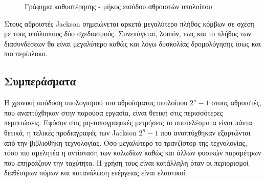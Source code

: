 \begin{figure}[H]
\begin{center}
\end{center}
\caption{Γράφημα καθυστέρησης - μήκος εισόδου αθροιστών υπολοίπου}   
\label{graph:gap_between_interconection_and_gates_delay}
\end{figure}


Στους αθροιστές Jackson σημειώνεται αρκετά μεγαλύτερο πλήθος κόμβων σε σχέση με τους υπόλοιπους δύο σχεδιασμούς. Συνεπάγεται, λοιπόν, πως και το πλήθος των διασυνδέσεων θα είναι μεγαλύτερο καθώς και λόγω δυσκολίας δρομολόγησης ίσως και πιο περίπλοκο.




\subsection{Συμπεράσματα}

Η χρονική απόδοση υπολογισμού του αθροίσματος υπολοίπου $2^n-1$ στους αθροιστές, που αναπτύχθηκαν στην παρούσα εργασία, είναι θετική στις περισσότερες περιπτώσεις. Εφόσον στις μη-τοπογραφικές μετρήσεις το αποτελέσματα είναι πάντα θετικά, η τελικές προδιαγραφές των Jackson $2^n-1$ που αναπτύχθηκαν εξαρτώνται από την βιβλιοθήκη τεχνολογίας. Όσο μεγαλύτερο το τρανζίστορ της τεχνολογίας, τόσο πιο αμελητέα η αντίσταση των καλωδίων καθώς και άλλων φυσικών παραμέτρων που επηρεάζουν την ταχύτητα. Η χρήση τους είναι κατάλληλη όταν οι περιορισμοί διαθέσιμων πόρων και κατανάλωση ενέργειας είναι ελαστικοί. 

